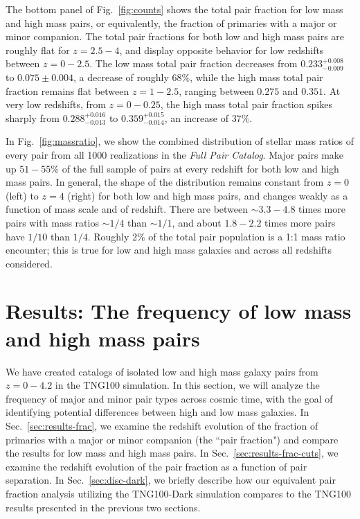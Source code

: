 \documentclass[linenumbers,twocolumn]{aastex631}
\newcommand{\paircat}{\textit{Full Pair Catalog}}
\begin{document}
    The bottom panel of Fig.~\ref{fig:counts} shows the total pair fraction for low mass and high mass pairs, or equivalently, the fraction of primaries with a major or minor companion.
    The total pair fractions for both low and high mass pairs are roughly flat for $z=2.5-4$, and display opposite behavior for low redshifts between $z=0-2.5$. 
    The low mass total pair fraction decreases from $0.233^{+0.008}_{-0.009}$ to $0.075\pm 0.004$, a decrease of roughly $68\%$, while the high mass total pair fraction remains flat between $z=1-2.5$, ranging between $0.275$ and $0.351$.
    At very low redshifts, from $z=0-0.25$, the high mass total pair fraction spikes sharply from $0.288^{+0.016}_{-0.013}$ to $0.359^{+0.015}_{-0.014}$, an increase of $37\%$.

    In Fig.~\ref{fig:massratio}, we show the combined distribution of stellar mass ratios of every pair from all 1000 realizations in the \paircat.
    Major pairs make up $51-55\%$ of the full sample of pairs at every redshift for both low and high mass pairs.
    In general, the shape of the distribution remains constant from $z=0$ (left) to $z=4$ (right) for both low and high mass pairs, and changes weakly as a function of mass scale and of redshift. 
    There are between $\sim3.3-4.8$ times more pairs with mass ratios $\sim1/4$ than $\sim1/1$, and about $1.8-2.2$ times more pairs have $1/10$ than $1/4$. 
    Roughly 2\% of the total pair population is a 1:1 mass ratio encounter; this is true for low and high mass galaxies and across all redshifts considered.  

\section{Results: The frequency of low mass and high mass pairs}
\label{sec:results}

We have created catalogs of isolated low and high mass galaxy pairs from $z=0-4.2$ in the TNG100 simulation. 
In this section, we will analyze the frequency of major and minor pair types across cosmic time, with the goal of identifying potential differences between high and low mass galaxies. 
In Sec.~\ref{sec:results-frac}, we examine the redshift evolution of the fraction of primaries with a major or minor companion (the ``pair fraction") and compare the results for low mass and high mass pairs.
In Sec.~\ref{sec:results-frac-cuts}, we examine the redshift evolution of the pair fraction as a function of pair separation. 
In Sec.~\ref{sec:disc-dark}, we briefly describe how our equivalent pair fraction analysis utilizing the TNG100-Dark simulation compares to the TNG100 results presented in the previous two sections. 
\end{document}
